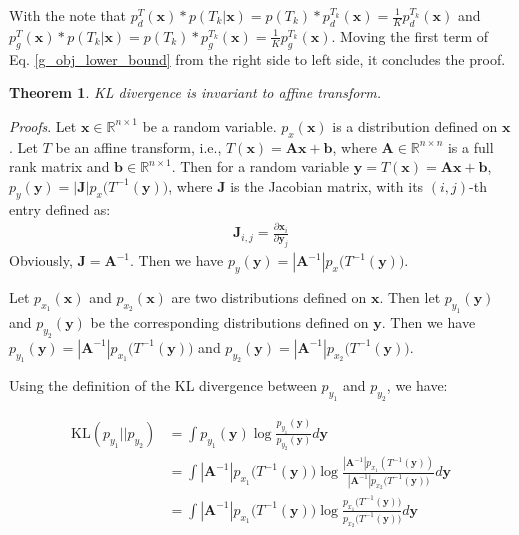 \documentclass{article}
\newtheorem{theorem}{Theorem}
\begin{document}
With the note that $p_d^T(\mathbf{x}) * p({T_k}|\mathbf{x}) = p(T_k) * p_d^{T_k}(\mathbf{x}) = \frac{1}{K}p_d^{T_k}(\mathbf{x})$ and $p_g^T(\mathbf{x}) * p({T_k}|\mathbf{x}) = p(T_k) * p_g^{T_k}(\mathbf{x}) = \frac{1}{K}p_g^{T_k}(\mathbf{x})$. Moving the first term of Eq. \ref{g_obj_lower_bound} from the right side to left side, it concludes the proof.

\begin{theorem}
KL divergence is invariant to affine transform.
\end{theorem}

\textit{Proofs}. Let $\mathbf{x}\in\mathbb{R}^{n\times 1}$ be a random variable. $p_x(\mathbf{x})$
is a distribution defined on $\mathbf{x}$. Let $T$ be an affine
transform, i.e., $T(\mathbf{x})=\boldsymbol{A}\mathbf{x}+\boldsymbol{b}$,
where $\boldsymbol{A}\in\mathbb{R}^{n\times n}$ is a full rank matrix and $\boldsymbol{b}\in\mathbb{R}^{n\times 1}$.
Then for a random variable $\mathbf{y}=T(\mathbf{x})=\boldsymbol{A}\mathbf{x}+\boldsymbol{b}$,
$p_y(\mathbf{y})=|\boldsymbol{J}|p_x\Big(T^{-1}(\mathbf{y})\Big)$, where $\boldsymbol{J}$
is the Jacobian matrix, with its $(i,j)$-th entry defined as:
\begin{align}
\boldsymbol{J}_{i,j}=\frac{\partial \mathbf{x}_i}{\partial \mathbf{y}_j}
\end{align}
Obviously, $\boldsymbol{J}=\boldsymbol{A}^{-1}$. Then we have
$p_y(\mathbf{y})=|\boldsymbol{A}^{-1}|p_x\Big(T^{-1}(\mathbf{y})\Big)$.

Let $p_{x_1}(\mathbf{x})$ and $p_{x_2}(\mathbf{x})$ are two distributions
defined on $\mathbf{x}$. Then let $p_{y_1}(\mathbf{y})$ and $p_{y_2}(\mathbf{y})$
be the corresponding distributions defined on $\mathbf{y}$.
Then we have $p_{y_1}(\mathbf{y})=|\boldsymbol{A}^{-1}|p_{x_1}\Big(T^{-1}(\mathbf{y})\Big)$
and $p_{y_2}(\mathbf{y})=|\boldsymbol{A}^{-1}|p_{x_2}\Big(T^{-1}(\mathbf{y})\Big)$.

Using the definition of the KL divergence between $p_{y_1}$ and $p_{y_2}$,
we have:

\begin{align}
\mathrm{KL}(p_{y_1}||p_{y_2})&=\int p_{y_1}(\mathbf{y})\log\frac{p_{y_1}(\mathbf{y})}{p_{y_2}(\mathbf{y})}d\mathbf{y}\\
&=\int|\boldsymbol{A}^{-1}| p_{x_1}\Big(T^{-1}(\mathbf{y})\Big)\log\frac{|\boldsymbol{A}^{-1}|p_{x_1}(T^{-1}(\mathbf{y}))}{|\boldsymbol{A}^{-1}|p_{x_2}\Big(T^{-1}(\mathbf{y})\Big)}d\mathbf{y}\\
&=\int|\boldsymbol{A}^{-1}| p_{x_1}\Big(T^{-1}(\mathbf{y})\Big)\log\frac{p_{x_1}\Big(T^{-1}(\mathbf{y})\Big)}{p_{x_2}\Big(T^{-1}(\mathbf{y})\Big)}d\mathbf{y}
\end{align}
\end{document}
